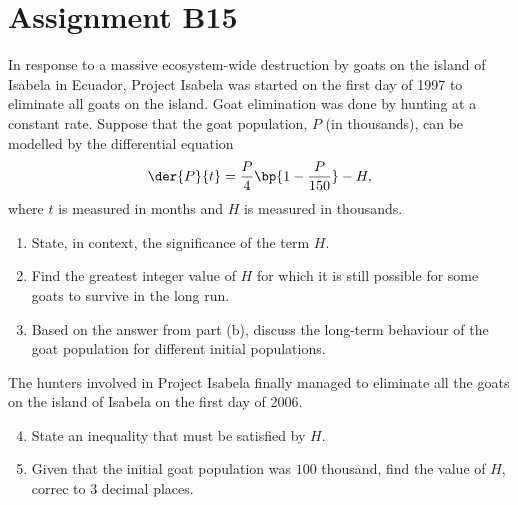 \section{Assignment B15}

\begin{problem}
    In response to a massive ecosystem-wide destruction by goats on the island of Isabela in Ecuador, Project Isabela was started on the first day of 1997 to eliminate all goats on the island. Goat elimination was done by hunting at a constant rate. Suppose that the goat population, $P$ (in thousands), can be modelled by the differential equation \[\der{P}{t} = \frac{P}{4} \bp{1 - \frac{P}{150}} - H,\] where $t$ is measured in months and $H$ is measured in thousands.
    \begin{enumerate}
        \item State, in context, the significance of the term $H$.
        \item Find the greatest integer value of $H$ for which it is still possible for some goats to survive in the long run.
        \item Based on the answer from part (b), discuss the long-term behaviour of the goat population for different initial populations.
    \end{enumerate}
    The hunters involved in Project Isabela finally managed to eliminate all the goats on the island of Isabela on the first day of 2006.
    \begin{enumerate}
        \setcounter{enumi}{3}
        \item State an inequality that must be satisfied by $H$.
        \item Given that the initial goat population was $100$ thousand, find the value of $H$, correc to 3 decimal places.
    \end{enumerate}
\end{problem}
